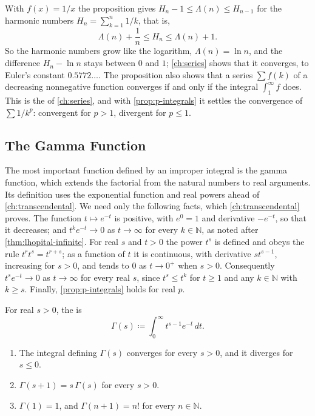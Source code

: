 With $f(x)=1/x$ the proposition gives $H_n-1\le\Lambda(n)\le H_{n-1}$ for the harmonic numbers $H_n=\sum_{k=1}^n1/k$, that is,
\[
\Lambda(n)+\frac1n\le H_n\le\Lambda(n)+1 .
\]
So the harmonic numbers grow like the logarithm, $\Lambda(n)=\ln n$, and the difference $H_n-\ln n$ stays between $0$ and $1$; \cref{ch:series} shows that it converges, to Euler's constant $0.5772\ldots$. The proposition also shows that a series $\sum f(k)$ of a decreasing nonnegative function converges if and only if the integral $\int_1^\infty f$ does. This is the  of \cref{ch:series}, and with \cref{prop:p-integrals} it settles the convergence of $\sum1/k^p$: convergent for $p>1$, divergent for $p\le1$.

\subsection{The Gamma Function}

The most important function defined by an improper integral is the gamma function, which extends the factorial from the natural numbers to real arguments. Its definition uses the exponential function and real powers ahead of \cref{ch:transcendental}. We need only the following facts, which \cref{ch:transcendental} proves. The function $t\mapsto e^{-t}$ is positive, with $e^0=1$ and derivative $-e^{-t}$, so that it decreases; and $t^ke^{-t}\to0$ as $t\to\infty$ for every $k\in\mathbb N$, as noted after \cref{thm:lhopital-infinite}. For real $s$ and $t>0$ the power $t^s$ is defined and obeys the rule $t^rt^s=t^{r+s}$; as a function of $t$ it is continuous, with derivative $st^{s-1}$, increasing for $s>0$, and tends to $0$ as $t\to0^+$ when $s>0$. Consequently $t^se^{-t}\to0$ as $t\to\infty$ for every real $s$, since $t^s\le t^k$ for $t\ge1$ and any $k\in\mathbb N$ with $k\ge s$. Finally, \cref{prop:p-integrals} holds for real $p$.

\begin{definition}
\label{def:gamma}
For real $s>0$, the  is
\[
\Gamma(s)\coloneqq\int_0^\infty t^{s-1}e^{-t}\,dt .
\]
\end{definition}

\begin{theorem}
\label{thm:gamma}
\leavevmode
\begin{enumerate}
\item The integral defining $\Gamma(s)$ converges for every $s>0$, and it diverges for $s\le0$.
\item $\Gamma(s+1)=s\,\Gamma(s)$ for every $s>0$.
\item $\Gamma(1)=1$, and $\Gamma(n+1)=n!$ for every $n\in\mathbb N$.
\end{enumerate}
\end{theorem}

